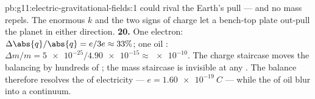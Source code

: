 \begin{solution}{pb:g11:electric-gravitational-fields:1}
could rival the Earth's pull --- and no mass repels. The enormous $k$
and the two signs of charge let a bench-top plate out-pull the planet
in either direction.
\textbf{20.} One electron: $\Delta\abs{q}/\abs{q} = e/3e \approx 33\%$;
one oil : $\Delta m/m = \num{5e-25} / \num{4.90e-15}
\approx \num{e-10}$. The charge staircase moves the balancing 
by hundreds of ; the mass staircase is invisible at any .
The balance therefore resolves the  of electricity ---
$e = \qty{1.60e-19}{C}$ --- while the  of oil blur into a
continuum.
\end{solution}
